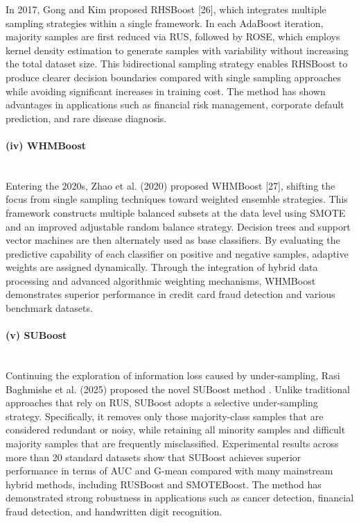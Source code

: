 \documentclass[sigconf]{acmart}
\begin{document}
In 2017, Gong and Kim proposed RHSBoost [26], which integrates multiple sampling strategies within a single framework. In each AdaBoost iteration, majority samples are first reduced via RUS, followed by ROSE, which employs kernel density estimation to generate samples with variability without increasing the total dataset size. This bidirectional sampling strategy enables RHSBoost to produce clearer decision boundaries compared with single sampling approaches while avoiding significant increases in training cost. The method has shown advantages in applications such as financial risk management, corporate default prediction, and rare disease diagnosis. 

\paragraph{(iv) WHMBoost}~\\

Entering the 2020s, Zhao et al. (2020) proposed WHMBoost [27], shifting the focus from single sampling techniques toward weighted ensemble strategies. This framework constructs multiple balanced subsets at the data level using SMOTE and an improved adjustable random balance strategy. Decision trees and support vector machines are then alternately used as base classifiers. By evaluating the predictive capability of each classifier on positive and negative samples, adaptive weights are assigned dynamically. Through the integration of hybrid data processing and advanced algorithmic weighting mechanisms, WHMBoost demonstrates superior performance in credit card fraud detection and various benchmark datasets. 

\paragraph{(v) SUBoost}~\\

Continuing the exploration of information loss caused by under-sampling, Rasi Baghmishe et al. (2025) proposed the novel SUBoost method \cite{28}. Unlike traditional approaches that rely on RUS, SUBoost adopts a selective under-sampling strategy. Specifically, it removes only those majority-class samples that are considered redundant or noisy, while retaining all minority samples and difficult majority samples that are frequently misclassified. Experimental results across more than 20 standard datasets show that SUBoost achieves superior performance in terms of AUC and G-mean compared with many mainstream hybrid methods, including RUSBoost and SMOTEBoost. The method has demonstrated strong robustness in applications such as cancer detection, financial fraud detection, and handwritten digit recognition. 
\end{document}
